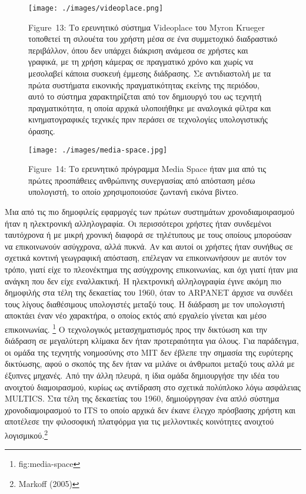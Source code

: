 \documentclass[
]{article}
\begin{document}
\leavevmode{}%
\begin{figure}
\hypertarget{fig:videoplace}{%
\centering
\texttt{[image: ./images/videoplace.png]}
\caption{Figure~13: Το ερευνητικό σύστημα Videoplace του Myron Krueger
τοποθετεί τη σιλουέτα του χρήστη μέσα σε ένα συμμετοχικό διαδραστικό
περιβάλλον, όπου δεν υπάρχει διάκριση ανάμεσα σε χρήστες και γραφικά, με
τη χρήση κάμερας σε πραγματικό χρόνο και χωρίς να μεσολαβεί κάποια
συσκευή έμμεσης διάδρασης. Σε αντιδιαστολή με τα πρώτα συστήματα
εικονικής πραγματικότητας εκείνης της περιόδου, αυτό το σύστημα
χαρακτηρίζεται από τον δημιουργό του ως τεχνητή πραγματικότητα, η οποία
αρχικά υλοποιήθηκε με αναλογικά φίλτρα και κινηματογραφικές τεχνικές
πριν περάσει σε τεχνολογίες υπολογιστικής όρασης.}\label{fig:videoplace}
}
\end{figure}

\leavevmode{}%
\begin{figure}
\hypertarget{fig:media-space}{%
\centering
\texttt{[image: ./images/media-space.jpg]}
\caption{Figure~14: Το ερευνητικό πρόγραμμα Media Space ήταν μια από τις
πρώτες προσπάθειες ανθρώπινης συνεργασίας από απόσταση μέσω υπολογιστή,
το οποίο χρησιμοποιούσε ζωντανή εικόνα βίντεο.}\label{fig:media-space}
}
\end{figure}

Μια από τις πιο δημοφιλείς εφαρμογές των πρώτων συστημάτων
χρονοδιαμοιρασμού ήταν η ηλεκτρονική αλληλογραφία. Οι περισσότεροι
χρήστες ήταν συνδεμένοι ταυτόχρονα ή με μικρή χρονική διαφορά σε
τηλέτυπους με τους οποίους μπορούσαν να επικοινωνούν ασύγχρονα, αλλά
πυκνά. Αν και αυτοί οι χρήστες ήταν συνήθως σε σχετικά κοντινή
γεωγραφική απόσταση, επέλεγαν να επικοινωνήσουν με αυτόν τον τρόπο,
γιατί είχε το πλεονέκτημα της ασύγχρονης επικοινωνίας, και όχι γιατί
ήταν μια ανάγκη που δεν είχε εναλλακτική. Η ηλεκτρονική αλληλογραφία
έγινε ακόμη πιο δημοφιλής στα τέλη της δεκαετίας του 1960, όταν το
ARPANET άρχισε να συνδέει τους λίγους διαθέσιμους υπολογιστές μεταξύ
τους. Η διάδραση με τον υπολογιστή αποκτάει έναν νέο χαρακτήρα, ο οποίος
εκτός από εργαλείο γίνεται και μέσο επικοινωνίας. \footnote{fig:media-space}
Ο τεχνολογικός μετασχηματισμός προς την δικτύωση και την διάδραση σε
μεγαλύτερη κλίμακα δεν ήταν προτεραιότητα για όλους. Για παράδειγμα, οι
ομάδα της τεχνητής νοημοσύνης στο ΜΙΤ δεν έβλεπε την σημασία της
ευρύτερης δικτύωσης, αφού ο σκοπός της δεν ήταν να μιλάνε οι άνθρωποι
μεταξύ τους αλλά με έξυπνες μηχανές. Από την άλλη πλευρά, η ίδια ομάδα
δημιουργήσε την ιδέα του ανοιχτού διαμοιρασμού, κυρίως ως αντίδραση στο
σχετικά πολύπλοκο λόγω ασφάλειας MULTICS. Στα τέλη της δεκαετίας του
1960, δημιούργησαν ένα απλό σύστημα χρονοδιαμοιρασμού το ITS το οποίο
αρχικά δεν έκανε έλεγχο πρόσβασης χρήστη και αποτέλεσε την φιλοσοφική
πλατφόρμα για τις μελλοντικές κοινότητες ανοιχτού λογισμικού.\footnote{Markoff
  (2005)}
\end{document}
